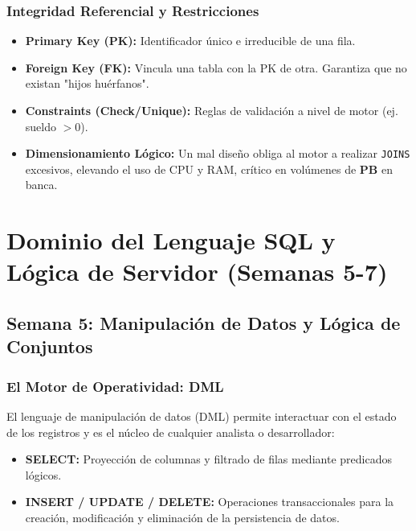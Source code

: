 \documentclass[12pt,a4paper,openany,oneside]{book}
\begin{document}
\subsection{Integridad Referencial y Restricciones}
\begin{itemize}
    \item \textbf{Primary Key (PK):} Identificador único e irreducible de una fila.
    \item \textbf{Foreign Key (FK):} Vincula una tabla con la PK de otra. Garantiza que no existan "hijos huérfanos".
    \item \textbf{Constraints (Check/Unique):} Reglas de validación a nivel de motor (ej. sueldo $> 0$).
    \item \textbf{Dimensionamiento Lógico:} Un mal diseño obliga al motor a realizar \texttt{JOINS} excesivos, elevando el uso de CPU y RAM, crítico en volúmenes de \textbf{PB} en banca.
\end{itemize}








\chapter{Dominio del Lenguaje SQL y Lógica de Servidor (Semanas 5-7)}

\section{Semana 5: Manipulación de Datos y Lógica de Conjuntos}

\subsection{El Motor de Operatividad: DML}
El lenguaje de manipulación de datos (DML) permite interactuar con el estado de los registros y es el núcleo de cualquier analista o desarrollador:
\begin{itemize}
    \item \textbf{SELECT:} Proyección de columnas y filtrado de filas mediante predicados lógicos.
    \item \textbf{INSERT / UPDATE / DELETE:} Operaciones transaccionales para la creación, modificación y eliminación de la persistencia de datos.
\end{itemize}
\end{document}
